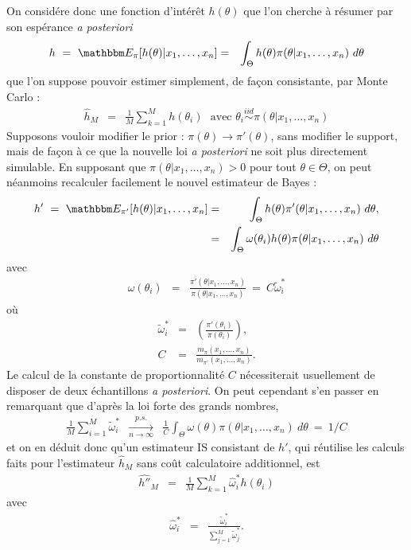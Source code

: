 \begin{rep}
On considére donc une fonction d'intérêt $h(\theta)$ que l'on cherche à résumer par son espérance {\it a posteriori}
\begin{eqnarray}
h \ = \ \E_{\pi}[h(\theta)|x_1,\ldots,x_n] & = & \int_{\Theta} h(\theta)\pi(\theta|x_1,\ldots,x_n) \ d\theta\label{IS.estim1}
\end{eqnarray}
que l'on suppose pouvoir estimer simplement, de fa\c con consistante, par Monte Carlo :
\begin{eqnarray*}
\hat{h}_M & = & \frac{1}{M}\sum\limits_{k=1}^M h(\theta_i) \ \ \ \text{avec $\theta_i\overset{iid}{\sim} \pi(\theta|x_1,\ldots,x_n)$}
\end{eqnarray*}
Supposons vouloir modifier le prior : $\pi(\theta)\to\pi'(\theta)$, sans modifier le support, mais de fa\c con à ce que la nouvelle loi {\it a posteriori} ne soit plus directement simulable. En supposant que $\pi(\theta|x_1,\ldots,x_n)>0$ pour tout $\theta\in\Theta$, on peut néanmoins recalculer facilement le nouvel estimateur de Bayes :
\begin{eqnarray*}
h' \ = \ \E_{\pi'}[h(\theta)|x_1,\ldots,x_n] & = & \int_{\Theta} h(\theta)\pi'(\theta|x_1,\ldots,x_n) \ d\theta, \\
& = & \int_{\Theta} \omega(\theta_i) h(\theta)\pi(\theta|x_1,\ldots,x_n) \ d\theta
\end{eqnarray*}
avec
\begin{eqnarray*}
\omega(\theta_i) & = & \frac{\pi'(\theta|x_1,\ldots,x_n) }{\pi(\theta|x_1,\ldots,x_n)} \ = \ C\tilde{\omega}^*_i 
\end{eqnarray*}
où 
\begin{eqnarray*}
\tilde{\omega}^*_i  & = & \left(\frac{\pi'(\theta_i)}{\pi(\theta_i)}\right), \\
C & = &  \frac{m_{\pi}(x_1,\ldots,x_n)}{m_{\pi'}(x_1,\ldots,x_n)}.
\end{eqnarray*}
Le calcul de la constante de proportionnalité $C$ nécessiterait usuellement de disposer de deux échantillons {\it a posteriori}. On peut cependant s'en passer en remarquant que d'après la loi forte des grands nombres,  \begin{eqnarray*}
\frac{1}{M}\sum\limits_{i=1}^M \tilde{\omega}^*_i & \xrightarrow[n\to \infty]{p.s.} & \frac{1}{C}\int_{\Theta} \omega(\theta) \pi(\theta|x_1,\ldots,x_n) \ d\theta \ = \ 1/C
\end{eqnarray*}
et on en déduit donc qu'un estimateur IS  consistant de $h'$,  qui réutilise les calculs faits pour l'estimateur $\hat{h}_M$  sans coût calculatoire additionnel, est 
\begin{eqnarray*}
\hat{h''}_M & = & \frac{1}{M}\sum\limits_{k=1}^M \hat{\omega}^*_i h(\theta_i)
\end{eqnarray*}
avec
\begin{eqnarray*}
\hat{\omega}^*_i & = & \frac{\tilde{\omega}^*_i}{\sum\limits_{j=1}^M \tilde{\omega}^*_j}.
\end{eqnarray*}


\end{rep}
